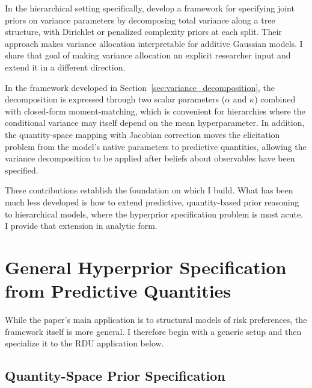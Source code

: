 \documentclass[12pt,a4paper]{article}
\theoremstyle{definition}
\theoremstyle{remark}
\begin{document}
In the hierarchical setting specifically, \textcite{Fuglstad2020} develop a
framework for specifying joint priors on variance parameters by decomposing
total variance along a tree structure, with Dirichlet or penalized complexity
priors at each split. Their approach makes variance allocation interpretable
for additive Gaussian models. I share that goal of making variance allocation an
explicit researcher input and extend it in a different direction.

In the framework developed in Section~\ref{sec:variance_decomposition}, the
decomposition is expressed through two scalar parameters ($\alpha$ and $\kappa$)
combined with closed-form moment-matching, which is convenient for hierarchies
where the conditional variance may itself depend on the mean hyperparameter.
In addition, the quantity-space mapping with Jacobian correction moves the
elicitation problem from the model's native parameters to predictive
quantities, allowing the variance decomposition to be applied after beliefs
about observables have been specified.

These contributions establish the foundation on which I build.
What has been much less developed is how to extend predictive, quantity-based
prior reasoning to hierarchical models, where the hyperprior specification
problem is most acute. I provide that extension in analytic form.



\section{General Hyperprior Specification from Predictive Quantities}
\label{sec:gq_space}

While the paper's main application is to structural models of risk preferences,
the framework itself is more general. I therefore begin with a generic setup
and then specialize it to the RDU application below.

\subsection{Quantity-Space Prior Specification}
\end{document}

